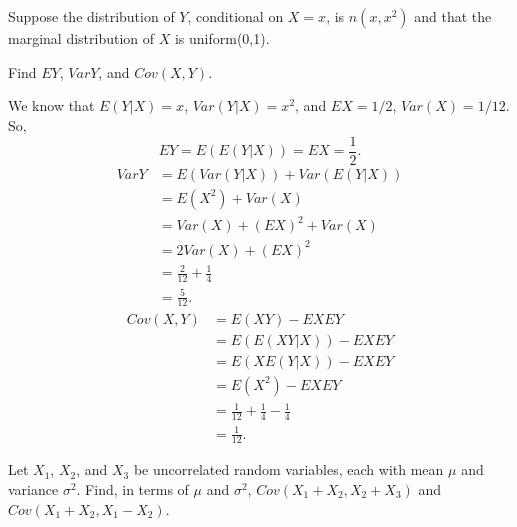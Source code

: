 \documentclass[14pt]{elegantbook}
\begin{document}


\setcounter{chapter}{8}

\chapter{}
\setcounter{chapter}{4}
\setcounter{exer}{29}
    \begin{exercise}
        Suppose the distribution of $Y$, conditional on $X=x$, is $n(x, x^2)$ and that the marginal distribution of $X$ is uniform(0,1). 
        
        Find $EY$, $Var Y$, and $Cov(X, Y)$. 
    \end{exercise}

    \begin{solution}
        We know that $E(Y|X)=x$, $Var(Y|X)=x^2$, and $EX=1/2$, $Var(X)=1/12$. So, 
        \[EY=E(E(Y|X))=EX=\frac{1}{2}. \]
        \begin{align*}
            VarY&=E(Var(Y|X))+Var(E(Y|X))\\
            &=E(X^2)+Var(X)\\
            &=Var(X)+(EX)^2+Var(X)\\
            &=2Var(X)+(EX)^2\\
            &=\frac{2}{12}+\frac{1}{4}\\
            &=\frac{5}{12}.
        \end{align*}
        \begin{align*}
            Cov(X, Y)&=E(XY)-EXEY\\
            &=E(E(XY|X))-EXEY\\
            &=E(XE(Y|X))-EXEY\\
            &=E(X^2)-EXEY\\
            &=\frac{1}{12}+\frac{1}{4}-\frac{1}{4}\\
            &=\frac{1}{12}.
        \end{align*}
    \end{solution}

    \setcounter{exer}{42}
    \begin{exercise}
        Let $X_1$, $X_2$, and $X_3$ be uncorrelated random variables, each with mean $\mu$ and variance $\sigma^2$. Find, in terms of $\mu$ and $\sigma^2$, $Cov(X_1 + X_2, X_2 + X_3)$ and $Cov(X_1 + X_2, X_1 - X_2)$. 
    \end{exercise}
\end{document}
